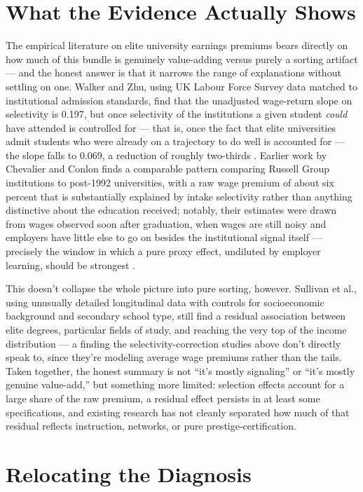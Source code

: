 \documentclass[11pt]{article}
\begin{document}
\section{What the Evidence Actually Shows}

The empirical literature on elite university earnings premiums bears directly on how much of this bundle is genuinely value-adding versus purely a sorting artifact --- and the honest answer is that it narrows the range of explanations without settling on one. Walker and Zhu, using UK Labour Force Survey data matched to institutional admission standards, find that the unadjusted wage-return slope on selectivity is 0.197, but once selectivity of the institutions a given student \emph{could} have attended is controlled for --- that is, once the fact that elite universities admit students who were already on a trajectory to do well is accounted for --- the slope falls to 0.069, a reduction of roughly two-thirds \cite{walkerzhu2018}. Earlier work by Chevalier and Conlon finds a comparable pattern comparing Russell Group institutions to post-1992 universities, with a raw wage premium of about six percent that is substantially explained by intake selectivity rather than anything distinctive about the education received; notably, their estimates were drawn from wages observed soon after graduation, when wages are still noisy and employers have little else to go on besides the institutional signal itself --- precisely the window in which a pure proxy effect, undiluted by employer learning, should be strongest \cite{chevalierconlon2003}.

This doesn't collapse the whole picture into pure sorting, however. Sullivan et al., using unusually detailed longitudinal data with controls for socioeconomic background and secondary school type, still find a residual association between elite degrees, particular fields of study, and reaching the very top of the income distribution \cite{sullivan2018} --- a finding the selectivity-correction studies above don't directly speak to, since they're modeling average wage premiums rather than the tails. Taken together, the honest summary is not ``it's mostly signaling'' or ``it's mostly genuine value-add,'' but something more limited: selection effects account for a large share of the raw premium, a residual effect persists in at least some specifications, and existing research has not cleanly separated how much of that residual reflects instruction, networks, or pure prestige-certification.

\section{Relocating the Diagnosis}
\end{document}
